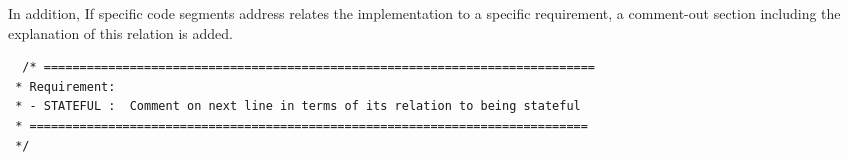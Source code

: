 \documentclass[12pt]{usenixsubmit}
\newlength\someheight
\begin{document}
\begin{appendices}
In addition, If specific code segments address relates the implementation to a specific requirement, a comment-out section including the explanation of this relation is added. 
 
    \begin{adjustbox}{width=\textwidth,height=\someheight,keepaspectratio}
    \begin{lstlisting}
  /* =============================================================================
 * Requirement:
 * - STATEFUL :  Comment on next line in terms of its relation to being stateful
 * ==============================================================================
 */      
    \end{lstlisting}
    \end{adjustbox}

\end{appendices}
 
\end{document}
